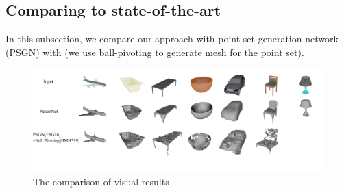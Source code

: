 \subsection{Comparing to state-of-the-art}
In this subsection, we compare our approach with point set generation network (PSGN)\cite{PSGN} 
with (we use ball-pivoting\cite{ballpivot} to generate mesh for the point set).
\begin{figure}[htbp]
	\centering
	\includegraphics[width=\linewidth]{img/res/res}
	\caption{The comparison of visual results}
	\label{fig:res}
\end{figure}
